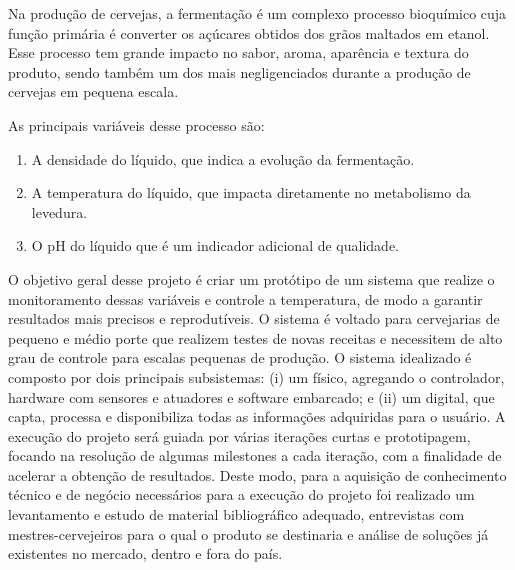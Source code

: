 Na produção de cervejas, a fermentação é um complexo processo bioquímico cuja função primária é converter os açúcares obtidos dos grãos maltados em etanol. Esse processo tem grande impacto no sabor, aroma, aparência e textura do produto, sendo também um dos mais negligenciados durante a produção de cervejas em pequena escala. 


As principais variáveis desse processo são:
\begin{enumerate}
 \item A densidade do líquido, que indica a evolução da fermentação.
 \item A temperatura do líquido, que impacta diretamente no metabolismo da levedura.
 \item O pH do líquido que é um indicador adicional de qualidade. 
\end{enumerate}

O objetivo geral desse projeto é criar um protótipo de um sistema que realize o monitoramento dessas variáveis e controle a temperatura, de modo a garantir resultados mais precisos e reprodutíveis. O sistema é voltado para cervejarias de pequeno e médio porte que realizem testes de novas receitas e necessitem de alto grau de controle para escalas pequenas de produção. 
O sistema idealizado é composto por dois principais subsistemas: (i) um físico, agregando o controlador, hardware com sensores e atuadores e software embarcado; e (ii) um digital, que capta, processa e disponibiliza todas as informações adquiridas para o usuário. A execução do projeto será guiada por várias iterações curtas e prototipagem, focando na resolução de algumas milestones a cada iteração, com a finalidade de acelerar a obtenção de resultados.
Deste modo, para a aquisição de conhecimento técnico e de negócio necessários para a execução do projeto foi realizado um levantamento e estudo de material bibliográfico adequado, entrevistas com mestres-cervejeiros para o qual o produto se destinaria e análise de soluções já existentes no mercado, dentro e fora do país.
